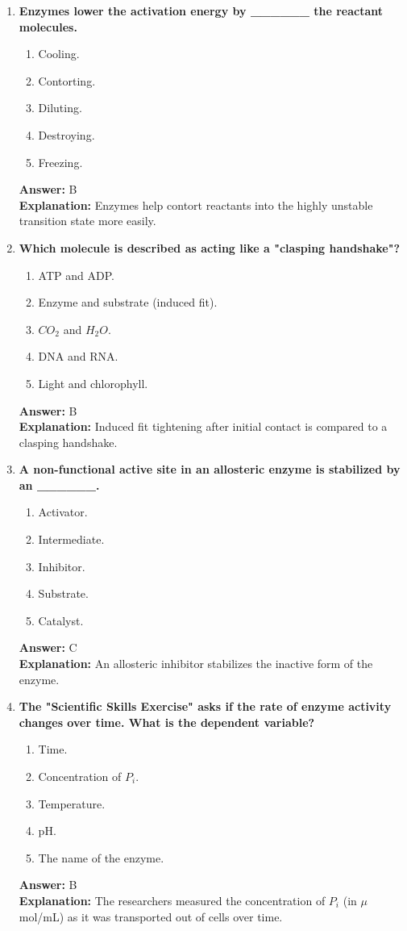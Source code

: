 \documentclass[11pt, a4paper]{article}
\begin{document}
\begin{enumerate}[leftmargin=*, label=\arabic*.]
\item \textbf{Enzymes lower the activation energy by \_\_\_\_\_\_ the reactant molecules.}
\begin{enumerate}[label=\Alph*.]
    \item Cooling.
    \item Contorting.
    \item Diluting.
    \item Destroying.
    \item Freezing.
\end{enumerate}
\textbf{Answer:} B \\
\textbf{Explanation:} Enzymes help contort reactants into the highly unstable transition state more easily.

\item \textbf{Which molecule is described as acting like a "clasping handshake"?}
\begin{enumerate}[label=\Alph*.]
    \item ATP and ADP.
    \item Enzyme and substrate (induced fit).
    \item $CO_2$ and $H_2O$.
    \item DNA and RNA.
    \item Light and chlorophyll.
\end{enumerate}
\textbf{Answer:} B \\
\textbf{Explanation:} Induced fit tightening after initial contact is compared to a clasping handshake.

\item \textbf{A non-functional active site in an allosteric enzyme is stabilized by an \_\_\_\_\_\_.}
\begin{enumerate}[label=\Alph*.]
    \item Activator.
    \item Intermediate.
    \item Inhibitor.
    \item Substrate.
    \item Catalyst.
\end{enumerate}
\textbf{Answer:} C \\
\textbf{Explanation:} An allosteric inhibitor stabilizes the inactive form of the enzyme.

\item \textbf{The "Scientific Skills Exercise" asks if the rate of enzyme activity changes over time. What is the dependent variable?}
\begin{enumerate}[label=\Alph*.]
    \item Time.
    \item Concentration of $P_i$.
    \item Temperature.
    \item pH.
    \item The name of the enzyme.
\end{enumerate}
\textbf{Answer:} B \\
\textbf{Explanation:} The researchers measured the concentration of $P_i$ (in $\mu$mol/mL) as it was transported out of cells over time.


\end{enumerate}
\end{document}
